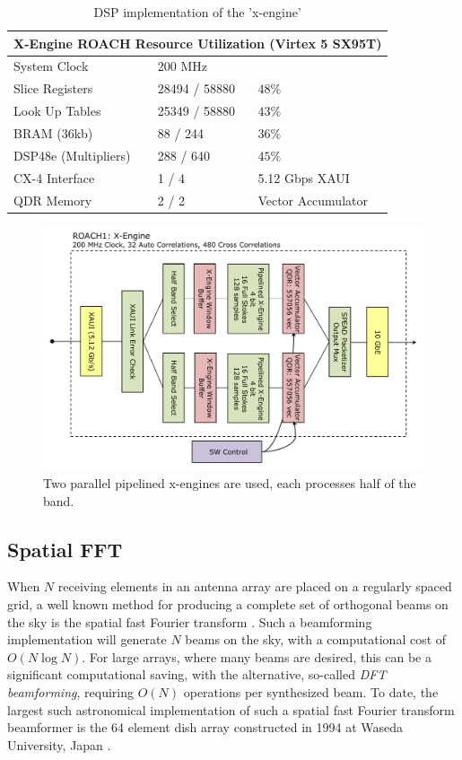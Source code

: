 \documentclass[useAMS,macros,usenatbib,onecolumn]{mn2e}
\begin{document}
\begin{table}
\begin{center}
\begin{tabular}{| l | l | l |}
\hline
\multicolumn{3}{|c|}{X-Engine ROACH Resource Utilization (Virtex 5 SX95T)}\\
\hline
System Clock & 200 MHz \\
Slice Registers & 28494 / 58880 & $48\%$\\
Look Up Tables & 25349 / 58880 & $43\%$\\
BRAM (36kb) & 88 / 244 & $36\%$\\
DSP48e (Multipliers) & 288 / 640 & $45\%$\\
CX-4 Interface & 1 / 4 & 5.12 Gbps XAUI\\
QDR Memory & 2 / 2 & Vector Accumulator\\
\hline
\end{tabular}
\caption{DSP implementation of the 'x-engine'}
\label{tbl:xeng_resource}
\end{center}
\end{table}

\begin{figure}
    \centering
    \includegraphics[scale=0.6]{graphics/crop_xengine_block.pdf}
    \caption{Two parallel pipelined x-engines are used, each processes half of the band.}
    \label{fig:xeng_block}
\end{figure}

\subsection{Spatial FFT}
\label{s-engine}
 
When $N$ receiving elements in an antenna array are placed on a regularly spaced grid, a well known method for producing a complete set of orthogonal beams on the sky is the spatial fast Fourier transform \citep{fastbeamforming}.
Such a beamforming implementation will generate $N$ beams on the sky, with a computational cost of $O(N\log{N})$. For large arrays, where many beams are desired, this can be a significant computational saving, with the alternative, so-called \emph{DFT beamforming}, requiring $O(N)$ operations per synthesized beam.
To date, the largest such astronomical implementation of such a spatial fast Fourier transform beamformer is the 64 element dish array constructed in 1994 at Waseda University, Japan \citep{2dfft}.
\end{document}
